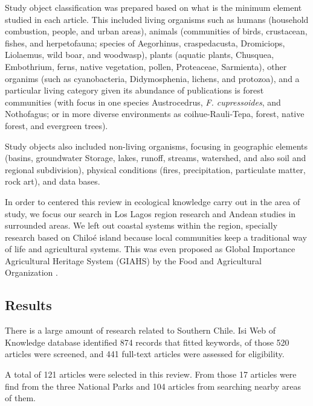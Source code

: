 \documentclass[]{article}
\begin{document}
Study object classification was prepared based on what is the minimum element studied in each article. This included living organisms such as humans (household combustion, people, and urban areas), animals (communities of birds, crustacean, fishes, and herpetofauna; species of Aegorhinus, craspedacusta, Dromiciops, Liolaemus, wild boar, and woodwasp), plants (aquatic plants, Chusquea, Embothrium, ferns, native vegetation, pollen, Proteaceae, Sarmienta), other organims (such as cyanobacteria, Didymosphenia, lichens, and protozoa), and a particular living category given its abundance of publications is forest communities (with focus in one species Austrocedrus, \emph{F. cupressoides}, and Nothofagus; or in more diverse environments as coihue-Rauli-Tepa, forest, native forest, and evergreen trees).

Study objects also included non-living organisms, focusing in geographic elements (basins, groundwater Storage, lakes, runoff, streams, watershed, and also soil and regional subdivision), physical conditions (fires, precipitation, particulate matter, rock art), and data bases.

In order to centered this review in ecological knowledge carry out in the area of study, we focus our search in Los Lagos region research and Andean studies in surrounded areas. We left out coastal systems within the region, specially research based on Chiloé island because local communities keep a traditional way of life and agricultural systems. This was even proposed as Global Importance Agricultural Heritage System (GIAHS) by the Food and Agricultural Organization \citep{FAO2003Chiloe, FAO2008Chiloe}.

\hypertarget{results}{%
\subsection{Results}\label{results}}

There is a large amount of research related to Southern Chile. Isi Web of Knowledge database identified 874 records that fitted keywords, of those 520 articles were screened, and 441 full-text articles were assessed for eligibility.

A total of 121 articles were selected in this review. From those 17 articles were find from the three National Parks and 104 articles from searching nearby areas of them.
\end{document}
